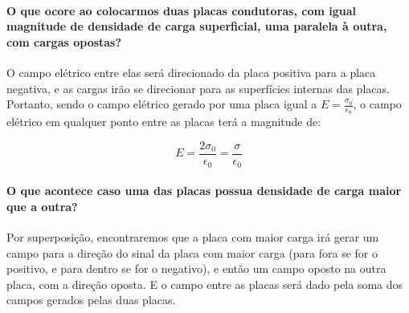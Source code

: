   \paragraph{O que ocore ao colocarmos duas placas condutoras, com igual magnitude de densidade de carga superficial, uma paralela à outra, com cargas opostas?} O campo elétrico entre elas será direcionado da placa positiva para a placa negativa, e as cargas irão se direcionar para as superfícies internas das placas. Portanto, sendo o campo elétrico gerado por uma placa igual a $E = \frac{\sigma_0}{\epsilon_0}$, o campo elétrico em qualquer ponto entre as placas terá a magnitude de:

  \[
    E = \frac{2 \sigma_0}{\epsilon_0} = \frac{\sigma}{\epsilon_0}
  \]

  \paragraph{O que acontece caso uma das placas possua densidade de carga maior que a outra?} Por superposição, encontraremos que a placa com maior carga irá gerar um campo para a direção do sinal da placa com maior carga (para fora se for o positivo, e para dentro se for o negativo), e então um campo oposto na outra placa, com a direção oposta. E o campo entre as placas será dado pela soma dos campos gerados pelas duas placas.
